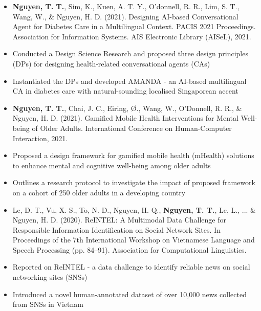 \documentclass[10pt,a4paper,ragged2e]{altacv}
\begin{document}
\begin{paracol}{2}
\begin{itemize}
	\item \textbf{Nguyen, T. T.}, Sim, K., Kuen, A. T. Y., O'donnell, R. R., Lim, S. T., Wang, W., \& Nguyen, H. D. (2021). Designing AI-based Conversational Agent for Diabetes Care in a Multilingual Context. PACIS 2021 Proceedings. Association for Information Systems. AIS Electronic Library (AISeL), 2021.
	\item Conducted a Design Science Research and proposed three design principles (DPs) for designing health-related conversational agents (CAs)
	\item Instantiated the DPs and developed AMANDA - an AI-based multilingual CA in diabetes care with natural-sounding localised Singaporean accent
\end{itemize}

\begin{itemize}
	\item \textbf{Nguyen, T. T.}, Chai, J. C., Eiring, Ø., Wang, W., O’Donnell, R. R., \& Nguyen, H. D. (2021). Gamified Mobile Health Interventions for Mental Well-being of Older Adults. International Conference on Human-Computer Interaction, 2021.
	\item Proposed a design framework for gamified mobile health (mHealth) solutions to enhance mental and cognitive well-being among older adults
	\item Outlines a research protocol to investigate the impact of proposed framework on a cohort of 250 older adults in a developing country
\end{itemize}

\begin{itemize}
	\item Le, D. T., Vu, X. S., To, N. D., Nguyen, H. Q., \textbf{Nguyen, T. T.}, Le, L., ... \& Nguyen, H. D. (2020). ReINTEL: A Multimodal Data Challenge for Responsible Information Identification on Social Network Sites. In Proceedings of the 7th International Workshop on Vietnamese Language and Speech Processing (pp. 84–91). Association for Computational Linguistics.
	\item Reported on ReINTEL - a data challenge to identify reliable news on social networking sites (SNSs)
	\item Introduced a novel human-annotated dataset of over 10,000 news collected from SNSs in Vietnam
\end{itemize}




\end{paracol}
\end{document}
